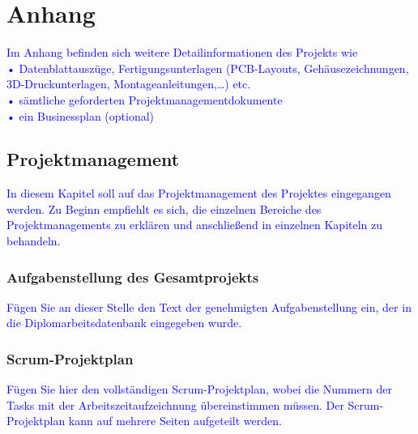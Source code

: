 \documentclass[12pt, twoside]{article}
\begin{document}
\newpage

\tableofcontents
\newpage


\newpage

\color{black}
\newpage
{}




\newpage
{}


\newpage
{}


\newpage
{}



\newpage
\section{Anhang}
\textcolor{blue}{Im Anhang befinden sich weitere Detailinformationen des Projekts wie\\
•	Datenblattauszüge, Fertigungsunterlagen (PCB-Layouts, Gehäusezeichnungen, 3D-Druckunterlagen, Montageanleitungen,…) etc.\\
•	sämtliche geforderten Projektmanagementdokumente\\
•	ein Businessplan (optional)
}

\subsection{Projektmanagement}
\textcolor{blue}{In diesem Kapitel soll auf das Projektmanagement des Projektes eingegangen werden. Zu Beginn empfiehlt es sich, die einzelnen Bereiche des Projektmanagements zu erklären und anschließend in einzelnen Kapiteln zu behandeln.}

\subsubsection{Aufgabenstellung des Gesamtprojekts}
\textcolor{blue}{Fügen Sie an dieser Stelle den Text der genehmigten Aufgabenstellung ein, der in die Diplomarbeitsdatenbank  eingegeben wurde.}

\subsubsection{Scrum-Projektplan}
\textcolor{blue}{Fügen Sie hier den vollständigen Scrum-Projektplan, wobei die Nummern der Tasks mit der Arbeitszeitaufzeichnung übereinstimmen müssen. Der Scrum-Projektplan kann auf mehrere Seiten aufgeteilt werden.}
\end{document}
